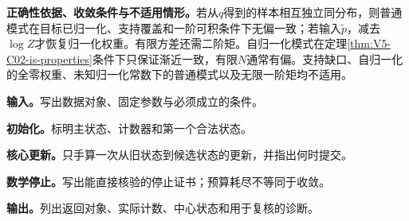 \textbf{正确性依据、收敛条件与不适用情形。}若从$q$得到的样本相互独立同分布，则普通模式在目标已归一化、支持覆盖和一阶可积条件下无偏一致；若输入$\widetilde p$，减去$\log Z$才恢复归一化权重。有限方差还需二阶矩。自归一化模式在定理\ref{thm:V5-C02-is-properties}条件下只保证渐近一致，有限$N$通常有偏。支持缺口、自归一化的全零权重、未知归一化常数下的普通模式以及无限一阶矩均不适用。

\begingroup
{}

\begin{keypointbox}[title={对数缩放的普通或自归一化重要性估计：五步阅读}]
\textbf{输入。}写出数据对象、固定参数与必须成立的条件。\par
\textbf{初始化。}标明主状态、计数器和第一个合法状态。\par
\textbf{核心更新。}只手算一次从旧状态到候选状态的更新，并指出何时提交。\par
\textbf{数学停止。}写出能直接核验的停止证书；预算耗尽不等同于收敛。\par
\textbf{输出。}列出返回对象、实际计数、中心状态和用于复核的诊断。
\end{keypointbox}

